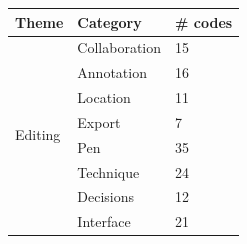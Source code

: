\begin{table}[h]
  \centering
  {\small
    \begin{tabular}{|l|l|l|} %
      \hline
      \textbf{Theme} & \textbf{Category} & \textbf{\# codes} \\ \hline
      \multirow{8}{*}{Editing}
      & Collaboration & 15 \\ \cline{2-3} %
      & Annotation & 16 \\ \cline{2-3} %
      & Location & 11 \\ \cline{2-3} %
      & Export & 7 \\ \cline{2-3} %
      & Pen & 35 \\ \cline{2-3} %
      & Technique & 24 \\ \cline{2-3} %
      & Decisions & 12 \\ \cline{2-3} %
      & Interface & 21 \\ \hline %

\end{tabular}}
\end{table}
